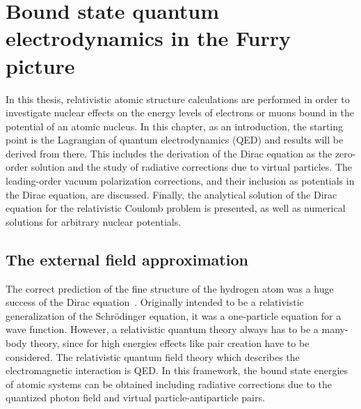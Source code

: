 \chapter{Bound state quantum electrodynamics in the Furry picture}
\label{ch:furry_pic}
In this thesis, relativistic atomic structure calculations are performed in order to investigate nuclear effects on the energy levels of electrons or muons bound in the potential of an atomic nucleus. In this chapter, as an introduction, the starting point is the Lagrangian of quantum electrodynamics (QED) and results will be derived from there. This includes the derivation of the Dirac equation as the zero-order solution and the study of radiative corrections due to virtual particles. The leading-order vacuum polarization corrections, and their inclusion as potentials in the Dirac equation, are discussed. Finally, the analytical solution of the Dirac equation for the relativistic Coulomb problem is presented, as well as numerical solutions for arbitrary nuclear potentials.
%
\section{The external field approximation}
\label{sec:ext_field}
The correct prediction of the fine structure of the hydrogen atom was a huge success of the Dirac equation~\cite{dirac1928}. Originally intended to be a relativistic generalization of the Schrödinger equation, it was a one-particle equation for a wave function. 
However, a relativistic quantum theory always has to be a many-body theory, since for high energies effects like pair creation have to be considered. The relativistic quantum field theory which describes the electromagnetic interaction is QED. In this framework, the bound state energies of atomic systems can be obtained including radiative corrections due to the quantized photon field and virtual particle-antiparticle pairs. 

